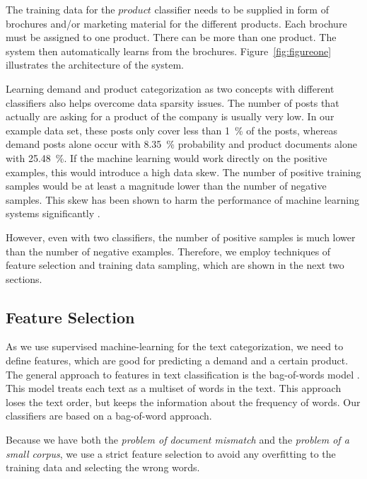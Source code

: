 The training data for the $product$ classifier needs to be supplied in form of brochures and/or marketing material for the different products.
Each brochure must be assigned to one product.
There can be more than one product.
The system then automatically learns from the brochures.
Figure~\ref{fig:figureone} illustrates the architecture of the system.

Learning demand and product categorization as two concepts with different classifiers also helps overcome data sparsity issues.
The number of posts that actually are asking for a product of the company is usually very low.
In our example data set, these posts only cover less than 1~\% of the posts, whereas demand posts alone occur with 8.35~\% probability and product documents alone with 25.48~\%.
If the machine learning would work directly on the positive examples, this would introduce a high data skew.
The number of positive training samples would be at least a magnitude lower than the number of negative samples.
This skew has been shown to harm the performance of machine learning systems significantly \cite{monard2002learning,guo2008class}.

However, even with two classifiers, the number of positive samples is much lower than the number of negative examples.
Therefore, we employ techniques of feature selection and training data sampling, which are shown in the next two sections.

\subsection{Feature Selection}
\label{sub:feature-selection}
As we use supervised machine-learning for the text categorization, we need to define features, which are good for predicting a demand and a certain product.
The general approach to features in text classification is the bag-of-words model \cite{yang1997comparative,zhang2010understanding}.
This model treats each text as a multiset of words in the text.
This approach loses the text order, but keeps the information about the frequency of words.
Our classifiers are based on a bag-of-word approach.

Because we have both the \emph{problem of document mismatch} and the \emph{problem of a small corpus}, we use a strict feature selection to avoid any overfitting to the training data and selecting the wrong words.

